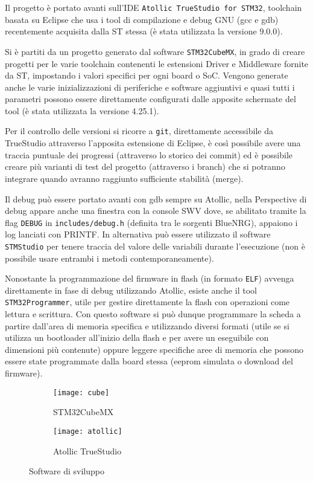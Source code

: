 
Il progetto \`e portato avanti sull'IDE \texttt{Atollic TrueStudio for STM32}, toolchain basata su Eclipse che usa i tool di compilazione e debug GNU (gcc e gdb) recentemente acquisita dalla ST stessa (\`e stata utilizzata la versione 9.0.0).

Si \`e partiti da un progetto generato dal software \texttt{STM32CubeMX}, in grado di creare progetti per le varie toolchain contenenti le estensioni Driver e Middleware fornite da ST, impostando i valori specifici per ogni board o SoC. Vengono generate anche le varie inizializzazioni di periferiche e software aggiuntivi e quasi tutti i parametri possono essere direttamente configurati dalle apposite schermate del tool (\`e stata utilizzata la versione 4.25.1).

Per il controllo delle versioni si ricorre a \texttt{git}, direttamente accessibile da TrueStudio attraverso l'apposita estensione di Eclipse, \`e cos\`i possibile avere una traccia puntuale dei progressi (attraverso lo storico dei commit) ed \`e possibile creare pi\`u varianti di test del progetto (attraverso i branch) che si potranno integrare quando avranno raggiunto sufficiente stabilit\`a (merge).

Il debug pu\`o essere portato avanti con gdb sempre su Atollic, nella Perspective di debug appare anche una finestra con la console SWV dove, se abilitato tramite la flag \texttt{DEBUG} in \texttt{includes/debug.h} (definita tra le sorgenti BlueNRG), appaiono i log lanciati con PRINTF. In alternativa pu\`o essere utilizzato il software \texttt{STMStudio} per tenere traccia del valore delle variabili durante l'esecuzione (non \`e possibile usare entrambi i metodi contemporaneamente).

Nonostante la programmazione del firmware in flash (in formato \texttt{ELF}) avvenga direttamente in fase di debug utilizzando Atollic, esiste anche il tool \texttt{STM32Programmer}, utile per gestire direttamente la flash con operazioni come lettura e scrittura. Con questo software si pu\`o dunque programmare la scheda a partire dall'area di memoria specifica e utilizzando diversi formati (utile se si utilizza un bootloader all'inizio della flash e per avere un eseguibile con dimensioni pi\`u contenute) oppure leggere specifiche aree di memoria che possono essere state programmate dalla board stessa (eeprom simulata o download del firmware).

\begin{figure}
  \center
  \begin{subfigure}{\textwidth}
    \texttt{[image: cube]}
    \caption{STM32CubeMX}
  \end{subfigure}
  \hfill \break
  \newline
  \begin{subfigure}{\textwidth}
    \texttt{[image: atollic]}
    \caption{Atollic TrueStudio}
  \end{subfigure}
  \caption{Software di sviluppo}
  \label{fig:apps}
\end{figure}

